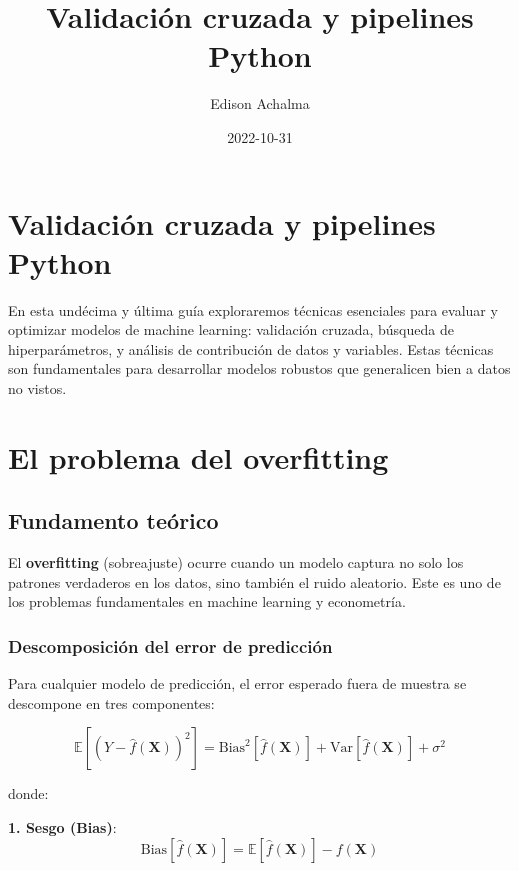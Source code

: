 \documentclass[
  doc,
  floatsintext,
  longtable,
  a4paper,
  nolmodern,
  notxfonts,
  notimes,
  12pt,
  colorlinks=true,linkcolor=blue,citecolor=blue,urlcolor=blue]{apa7}
\title{Validación cruzada y pipelines Python}
\author{Edison Achalma}
\affiliation{
{Escuela Profesional de Economía, Universidad Nacional de San Cristóbal
de Huamanga}}
\date{2022-10-31}
\begin{document}
\maketitle


\hypertarget{toc}{}
\tableofcontents
\newpage
\section[Introduction]{Validación cruzada y pipelines Python}

\setcounter{secnumdepth}{3}

\setlength\LTleft{0pt}




En esta undécima y última guía exploraremos técnicas esenciales para
evaluar y optimizar modelos de machine learning: validación cruzada,
búsqueda de hiperparámetros, y análisis de contribución de datos y
variables. Estas técnicas son fundamentales para desarrollar modelos
robustos que generalicen bien a datos no vistos.

\section{El problema del overfitting}\label{el-problema-del-overfitting}

\subsection{Fundamento teórico}\label{fundamento-teuxf3rico}

El \textbf{overfitting} (sobreajuste) ocurre cuando un modelo captura no
solo los patrones verdaderos en los datos, sino también el ruido
aleatorio. Este es uno de los problemas fundamentales en machine
learning y econometría.

\subsubsection{Descomposición del error de
predicción}\label{descomposiciuxf3n-del-error-de-predicciuxf3n}

Para cualquier modelo de predicción, el error esperado fuera de muestra
se descompone en tres componentes:

\[
\mathbb{E}[(Y - \hat{f}(\mathbf{X}))^2] = \text{Bias}^2[\hat{f}(\mathbf{X})] + \text{Var}[\hat{f}(\mathbf{X})] + \sigma^2
\]

donde:

\textbf{1. Sesgo (Bias)}: \[
\text{Bias}[\hat{f}(\mathbf{X})] = \mathbb{E}[\hat{f}(\mathbf{X})] - f(\mathbf{X})
\]
\end{document}
